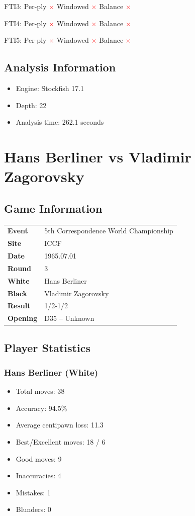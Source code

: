 \documentclass[11pt]{book}
\begin{document}
FTI3: Per-ply \textcolor{red}{$\times$} \quad Windowed \textcolor{red}{$\times$} \quad Balance \textcolor{red}{$\times$}

FTI4: Per-ply \textcolor{red}{$\times$} \quad Windowed \textcolor{red}{$\times$} \quad Balance \textcolor{red}{$\times$}

FTI5: Per-ply \textcolor{red}{$\times$} \quad Windowed \textcolor{red}{$\times$} \quad Balance \textcolor{red}{$\times$}

\section{Analysis Information}
\begin{itemize}
\item Engine: Stockfish 17.1
\item Depth: 22
\item Analysis time: 262.1 seconds
\end{itemize}

\chapter{Hans Berliner vs Vladimir Zagorovsky}

\section{Game Information}
\begin{tabular}{ll}
\textbf{Event} & 5th Correspondence World Championship \\
\textbf{Site} & ICCF \\
\textbf{Date} & 1965.07.01 \\
\textbf{Round} & 3 \\
\textbf{White} & Hans Berliner \\
\textbf{Black} & Vladimir Zagorovsky \\
\textbf{Result} & 1/2-1/2 \\
\textbf{Opening} & D35 -- Unknown \\
\end{tabular}

\section{Player Statistics}

\subsection{Hans Berliner (White)}
\begin{itemize}
\item Total moves: 38
\item Accuracy: 94.5\%
\item Average centipawn loss: 11.3
\item Best/Excellent moves: 18 / 6
\item Good moves: 9
\item Inaccuracies: 4
\item Mistakes: 1
\item Blunders: 0
\end{itemize}
\end{document}
